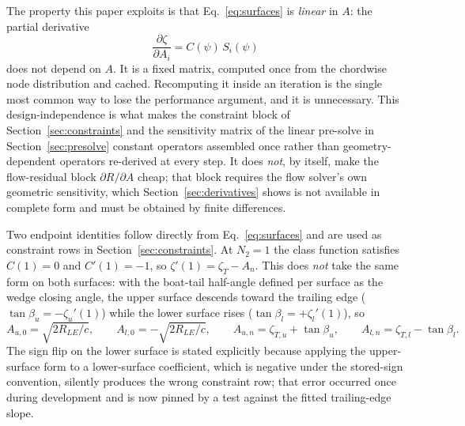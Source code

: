 The property this paper exploits is that Eq.~\eqref{eq:surfaces} is
\emph{linear} in $A$: the partial derivative
\begin{equation}
  \frac{\partial \zeta}{\partial A_i} = C(\psi)\,S_i(\psi)
  \label{eq:dsurface-dA}
\end{equation}
does not depend on $A$. It is a fixed matrix, computed once from the chordwise
node distribution and cached. Recomputing it inside an iteration is the single
most common way to lose the performance argument, and it is unnecessary. This
design-independence is what makes the constraint block of
Section~\ref{sec:constraints} and the sensitivity matrix of the linear
pre-solve in Section~\ref{sec:presolve} constant operators assembled once
rather than geometry-dependent operators re-derived at every step. It does
\emph{not}, by itself, make the flow-residual block $\partial R/\partial A$
cheap; that block requires the flow solver's own geometric sensitivity, which
Section~\ref{sec:derivatives} shows is not available in complete form and must
be obtained by finite differences.

Two endpoint identities follow directly from Eq.~\eqref{eq:surfaces} and are
used as constraint rows in Section~\ref{sec:constraints}. At $N_2=1$ the class
function satisfies $C(1)=0$ and $C'(1)=-1$, so
$\zeta'(1) = \zeta_T - A_n$. This does \emph{not} take the same form on both
surfaces: with the boat-tail half-angle defined per surface as the wedge
closing angle, the upper surface descends toward the trailing edge
($\tan\beta_u = -\zeta_u'(1)$) while the lower surface rises
($\tan\beta_l = +\zeta_l'(1)$), so
\begin{equation}
  A_{u,0} = \sqrt{2R_{LE}/c}, \qquad A_{l,0} = -\sqrt{2R_{LE}/c}, \qquad
  A_{u,n} = \zeta_{T,u} + \tan\beta_u, \qquad
  A_{l,n} = \zeta_{T,l} - \tan\beta_l.
  \label{eq:endpoint}
\end{equation}
The sign flip on the lower surface is stated explicitly because applying the
upper-surface form to a lower-surface coefficient, which is negative under the
stored-sign convention, silently produces the wrong constraint row; that error
occurred once during development and is now pinned by a test against the
fitted trailing-edge slope.

